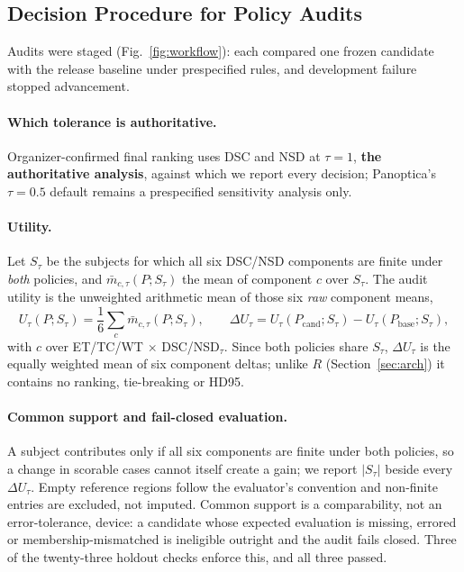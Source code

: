 \documentclass[runningheads]{llncs}
\begin{document}
\subsection{Decision Procedure for Policy Audits}
\label{sec:procedure}
Audits were staged (Fig.~\ref{fig:workflow}): each compared one frozen candidate with the release
baseline under prespecified rules, and development failure stopped advancement.

\paragraph{Which tolerance is authoritative.} Organizer-confirmed final ranking uses DSC and NSD at
$\tau=1$, \textbf{the authoritative analysis}, against which we report every decision; Panoptica's
$\tau=0.5$ default remains a prespecified sensitivity analysis only.

\paragraph{Utility.} Let $S_\tau$ be the subjects for which all six DSC/NSD components are finite
under \emph{both} policies, and $\bar m_{c,\tau}(P;S_\tau)$ the mean of component $c$ over $S_\tau$.
The audit utility is the unweighted arithmetic mean of those six \emph{raw} component means,
\begin{equation}
U_\tau(P;S_\tau)=\frac{1}{6}\sum_{c}\bar m_{c,\tau}(P;S_\tau),\qquad
\Delta U_\tau = U_\tau(P_{\mathrm{cand}};S_\tau)-U_\tau(P_{\mathrm{base}};S_\tau),
\end{equation}
with $c$ over ET/TC/WT $\times$ DSC/NSD$_\tau$. Since both policies share $S_\tau$, $\Delta U_\tau$ is
the equally weighted mean of six component deltas; unlike $R$ (Section~\ref{sec:arch}) it contains no
ranking, tie-breaking or HD95.

\paragraph{Common support and fail-closed evaluation.} A subject contributes only if all six
components are finite under both policies, so a change in scorable cases cannot itself create a gain;
we report $|S_\tau|$ beside every $\Delta U_\tau$. Empty reference regions follow the evaluator's
convention and non-finite entries are excluded, not imputed. Common support is a comparability, not
an error-tolerance, device: a candidate whose expected evaluation is missing, errored or
membership-mismatched is ineligible outright and the audit fails closed. Three of the twenty-three
holdout checks enforce this, and all three passed.
\end{document}
